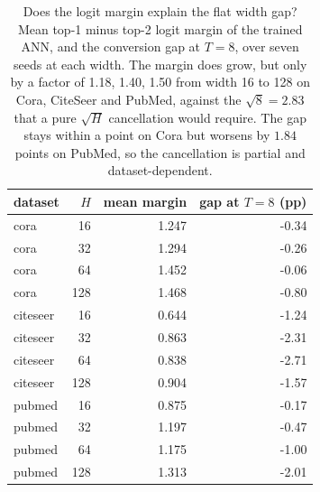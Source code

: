 \begin{table}[t]
\centering
\footnotesize
\caption{Does the logit margin explain the flat width gap? Mean top-1 minus top-2 logit margin of the trained ANN, and the conversion gap at $T=8$, over seven seeds at each width. The margin does grow, but only by a factor of 1.18, 1.40, 1.50 from width 16 to 128 on Cora, CiteSeer and PubMed, against the $\sqrt{8}=2.83$ that a pure $\sqrt{H}$ cancellation would require. The gap stays within a point on Cora but worsens by $1.84$ points on PubMed, so the cancellation is partial and dataset-dependent.}\label{tab:margin}
\begin{tabular}{lrrr}
\toprule
dataset & $H$ & mean margin & gap at $T=8$ (pp) \\
\midrule
cora & 16 & 1.247 & -0.34 \\
cora & 32 & 1.294 & -0.26 \\
cora & 64 & 1.452 & -0.06 \\
cora & 128 & 1.468 & -0.80 \\
\midrule
citeseer & 16 & 0.644 & -1.24 \\
citeseer & 32 & 0.863 & -2.31 \\
citeseer & 64 & 0.838 & -2.71 \\
citeseer & 128 & 0.904 & -1.57 \\
\midrule
pubmed & 16 & 0.875 & -0.17 \\
pubmed & 32 & 1.197 & -0.47 \\
pubmed & 64 & 1.175 & -1.00 \\
pubmed & 128 & 1.313 & -2.01 \\
\bottomrule
\end{tabular}
\end{table}
